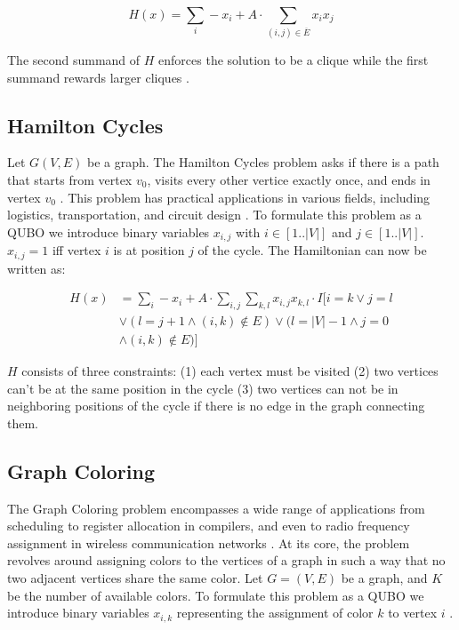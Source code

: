 \documentclass[conference]{IEEEtran}
\theoremstyle{plain}
\theoremstyle{definition}
\theoremstyle{remark}
\begin{document}
\[
H(x) = \sum_i -x_i + A \cdot \sum_{(i,j) \in \overline{E}} x_i x_j 
\]

The second summand of $H$ enforces the solution to be a clique while the first summand rewards larger cliques \cite{lucas2014ising}.

\subsection{Hamilton Cycles}
Let $G(V,E)$ be a graph. The Hamilton Cycles problem asks if there is a path that starts from vertex $v_0$, visits every other vertice exactly once, and ends in vertex $v_0$ \cite{lucas2014ising}. This problem has practical applications in various fields, including logistics, transportation, and circuit design \cite{kawarabayashi2001survey, laporte2007locating}. To formulate this problem as a QUBO we introduce binary variables $x_{i,j}$ with $i \in [1..|V|]$ and $j \in [1..|V|]$. $x_{i,j} = 1$ iff vertex $i$ is at position $j$ of the cycle. The Hamiltonian can now be written as:

\begin{equation*}
\begin{aligned}
    H(x) &= \sum_i -x_i + A \cdot \sum_{i,j} \sum_{k,l} x_{i,j} x_{k,l} \cdot I[i=k \lor j=l \\ &\lor (l = j + 1 \land (i,k) \notin E) \lor (l = |V| - 1 \land j = 0 \\ &\land (i,k) \notin E)]
\end{aligned}
\end{equation*}

$H$ consists of three constraints: (1) each vertex must be visited (2) two vertices can't be at the same position in the cycle (3) two vertices can not be in neighboring positions of the cycle if there is no edge in the graph connecting them.

\subsection{Graph Coloring}
The Graph Coloring problem encompasses a wide range of applications from scheduling to register allocation in compilers, and even to radio frequency assignment in wireless communication networks \cite{ahmed2012applications}. At its core, the problem revolves around assigning colors to the vertices of a graph in such a way that no two adjacent vertices share the same color. Let $G=(V,E)$ be a graph, and $K$ be the number of available colors. To formulate this problem as a QUBO we introduce binary variables $x_{i,k}$ representing the assignment of color $k$ to vertex $i$ \cite{lucas2014ising}.
\end{document}
